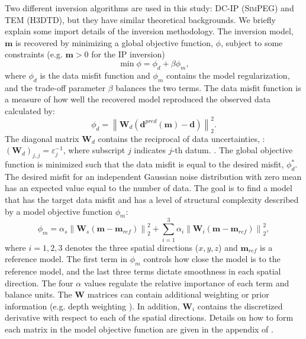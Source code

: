 \documentclass[paper]{geophysics}
\newcommand{\SimPEG}{\textsc{SimPEG}\xspace}
\begin{document}
Two different inversion algorithms are used in this study: DC-IP (\SimPEG) and TEM (H3DTD), but they have similar theoretical backgrounds. We briefly explain some import details of the inversion methodology.
The inversion model, $\mathbf{m}$ is recovered by minimizing a global objective function, $\phi$, subject to some constraints (e.g. $\mathbf{m} > 0$ for the IP inversion)
\begin{equation}
\min \phi = \phi_d + \beta \phi_m,
\label{phi}
\end{equation}
%
where $\phi_d$ is the data misfit function and $\phi_m$ contains the model regularization, and the trade-off parameter $\beta$ balances the two terms.
The data misfit function is a measure of how well the recovered model reproduced the observed data calculated by:
%
\begin{equation}
\phi_d = \left\| \mathbf{W}_d (\mathbf{d}^{pred}(\mathbf{m}) - \mathbf{d}) \right\|^2_2.
\label{phid}
\end{equation}
%
The diagonal matrix $\mathbf{W}_d$ contains the reciprocal of data uncertainties,
: $(\mathbf{W}_d)_{j,j}=\varepsilon^{-1}_j$, where subscript $j$ indicates $j$-th datum.
. The global objective function is minimized such that the data misfit is equal to the desired misfit, $\phi_d^*$. The desired misfit for an independent Gaussian noise distribution with zero mean has an expected value equal to the number of data. The goal is to find a model that has the target data misfit and has a level of structural complexity described by a model objective function $\phi_m$:
%
\begin{equation}
\phi_m = \alpha_s \left\|\mathbf{W}_s (\mathbf{m} - \mathbf{m}_{ref})\right\|^2_2 + \sum_{i=1}^{3} \alpha_i \left\|\mathbf{W}_i (\mathbf{m} - \mathbf{m}_{ref})\right\|^2_2,
\label{phim}
\end{equation}
%
where $i = 1, 2, 3$ denotes the three spatial directions ($x, y, z$) and $\mathbf{m}_{ref}$ is a reference model. The first term in $\phi_m$ controls how close the model is to the reference model, and the last three terms dictate smoothness in each spatial direction. The four $\alpha$ values regulate the relative importance of each term and balance units. The $\mathbf{W}$ matrices can contain additional weighting or prior information (e.g. depth weighting \cite{Li1996}). In addition, $\mathbf{W}_i$ contains the discretized derivative with respect to each of the spatial directions. Details on how to form each matrix in the model objective function are given in the appendix of \cite{DougTutorial}.
\end{document}
